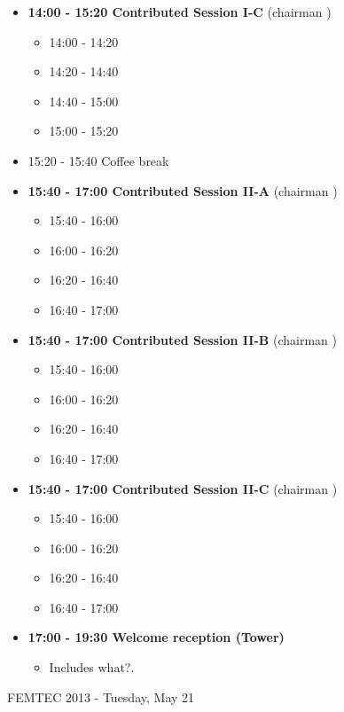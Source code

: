 \documentclass[10pt, A4]{article}%
\begin{document}
\begin{itemize}
\begin{itemize}
  \end{itemize}
    \item {\bf 14:00 - 15:20 Contributed Session I-C} (chairman ) 
  \begin{itemize}
    \item 14:00 - 14:20 
    \item 14:20 - 14:40 
    \item 14:40 - 15:00 
    \item 15:00 - 15:20 
  \end{itemize}
  \item 15:20 - 15:40 Coffee break
  \item {\bf 15:40 - 17:00 Contributed Session II-A} (chairman ) 
  \begin{itemize}
    \item 15:40 - 16:00
    \item 16:00 - 16:20 
    \item 16:20 - 16:40 
    \item 16:40 - 17:00 
  \end{itemize}
  \item {\bf 15:40 - 17:00 Contributed Session II-B} (chairman ) 
  \begin{itemize}
    \item 15:40 - 16:00
    \item 16:00 - 16:20 
    \item 16:20 - 16:40 
    \item 16:40 - 17:00 
  \end{itemize}
    \item {\bf 15:40 - 17:00 Contributed Session II-C} (chairman ) 
  \begin{itemize}
    \item 15:40 - 16:00
    \item 16:00 - 16:20 
    \item 16:20 - 16:40 
    \item 16:40 - 17:00 
  \end{itemize}    
  \item {\bf 17:00 - 19:30 Welcome reception (Tower)} 
  \begin{itemize}
     \item Includes what?.
  \end{itemize}
\end{itemize}

\newpage

\centerline{\huge FEMTEC 2013 - Tuesday, May 21}
\vspace{4mm}
\end{document}

